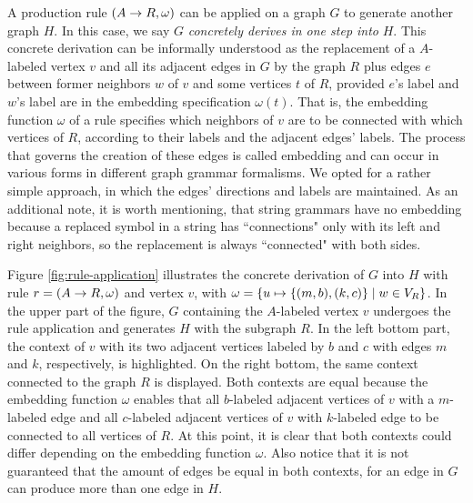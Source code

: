 A production rule $(A \to R, \omega)$ can be applied on a graph $G$ to generate another graph $H$. In this case, we say $G$ \textit{concretely derives in one step into} $H$. This concrete derivation can be informally understood as the replacement of a $A$-labeled vertex $v$ and all its adjacent edges in $G$ by the graph $R$ plus edges $e$ between former neighbors $w$ of $v$ and some vertices $t$ of $R$, provided $e$'s label and $w$'s label are in the embedding specification $\omega(t)$. That is, the embedding function $\omega$ of a rule specifies which neighbors of $v$ are to be connected with which vertices of $R$, according to their labels and the adjacent edges' labels. The process that governs the creation of these edges is called embedding and can occur in various forms in different graph grammar formalisms. We opted for a rather simple approach, in which the edges' directions and labels are maintained. As an additional note, it is worth mentioning, that string grammars have no embedding because a replaced symbol in a string has ``connections" only with its left and right neighbors, so the replacement is always ``connected" with both sides.

Figure \ref{fig:rule-application} illustrates the concrete derivation of $G$ into $H$ with rule $r = (A \to R, \omega)$ and vertex $v$, with $\omega = \{u \mapsto \{(m,b),(k,c)\} \; | \; w \in V_R\}$. In the upper part of the figure, $G$ containing the $A$-labeled vertex $v$ undergoes the rule application and generates $H$ with the subgraph $R$. In the left bottom part, the context of $v$ with its two adjacent vertices labeled by $b$ and $c$ with edges $m$ and $k$, respectively, is highlighted. On the right bottom, the same context connected to the graph $R$ is displayed. Both contexts are equal because the embedding function $\omega$ enables that all $b$-labeled adjacent vertices of $v$ with a $m$-labeled edge and all $c$-labeled adjacent vertices of $v$ with $k$-labeled edge to be connected to all vertices of $R$. At this point, it is clear that both contexts could differ depending on the embedding function $\omega$. Also notice that it is not guaranteed that the amount of edges be equal in both contexts, for an edge in $G$ can produce more than one edge in $H$.

